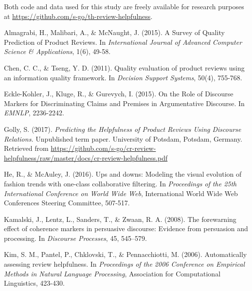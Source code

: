 \documentclass[
    a4paper,%
    12pt,%
    oneside,%
    toc=bibliography,
    final,
]{scrartcl}
\begin{document}
\vfill


\begin{center}
Both code and data used for this study are freely available for research purposes at \url{https://github.com/s-go/th-review-helpfulness}.
\end{center}

\newpage
\begin{thebibliography}{9}

 Almagrabi, H., Malibari, A., \& McNaught, J. (2015). A Survey of Quality Prediction of Product Reviews. In \textit{International Journal of Advanced Computer Science \& Applications}, 1(6), 49-58.

 Chen, C. C., \& Tseng, Y. D. (2011). Quality evaluation of product reviews using an information quality framework. In \textit{Decision Support Systems}, 50(4), 755-768.

 Eckle-Kohler, J., Kluge, R., \& Gurevych, I. (2015). On the Role of Discourse Markers for Discriminating Claims and Premises in Argumentative Discourse. In \textit{EMNLP}, 2236-2242.

 Golly, S. (2017). \textit{Predicting the Helpfulness of Product Reviews Using Discourse Relations.} Unpublished term paper. University of Potsdam, Potsdam, Germany. Retrieved from \url{https://github.com/s-go/cr-review-helpfulness/raw/master/docs/cr-review-helpfulness.pdf}

 He, R., \& McAuley, J. (2016). Ups and downs: Modeling the visual evolution of fashion trends with one-class collaborative filtering. In \textit{Proceedings of the 25th International Conference on World Wide Web}, International World Wide Web Conferences Steering Committee, 507-517.

 Kamalski, J., Lentz, L., Sanders, T., \& Zwaan, R. A. (2008). The forewarning effect of coherence markers in persuasive discourse: Evidence from persuasion and processing. In \textit{Discourse Processes}, 45, 545–579.

 Kim, S. M., Pantel, P., Chklovski, T., \& Pennacchiotti, M. (2006). Automatically assessing review helpfulness. In \textit{Proceedings of the 2006 Conference on Empirical Methods in Natural Language Processing}, Association for Computational Linguistics, 423-430.


\end{thebibliography}
\end{document}
